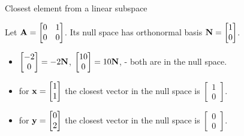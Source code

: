 \documentclass{beamer}
\begin{document}
\begin{frame}{Closest element from a linear subspace}
	\begin{flushleft}
		
		Let $\mathbf{A} = \begin{bmatrix} 0 & 1 \\ 0 & 0\end{bmatrix}$. Its null space has orthonormal basis $\mathbf{N} = \begin{bmatrix} 1 \\ 0\end{bmatrix}$. 
		
		\begin{itemize}
			\item $\begin{bmatrix} -2 \\ 0 \end{bmatrix} = 
			-2 \mathbf{N}$,
			$\begin{bmatrix} 10 \\ 0 \end{bmatrix} = 
			10 \mathbf{N}$, - both are in the null space.
			\item for $\mathbf{x} = \begin{bmatrix} 1 \\ 1 \end{bmatrix}$ the closest vector in the null space is $\begin{bmatrix} 1 \\ 0 \end{bmatrix}$.
			\item for $\mathbf{y} = \begin{bmatrix} 0 \\ 2 \end{bmatrix}$ the closest vector in the null space is $\begin{bmatrix} 0 \\ 0 \end{bmatrix}$.
		\end{itemize}
		
		
	\end{flushleft}
\end{frame}
\end{document}
